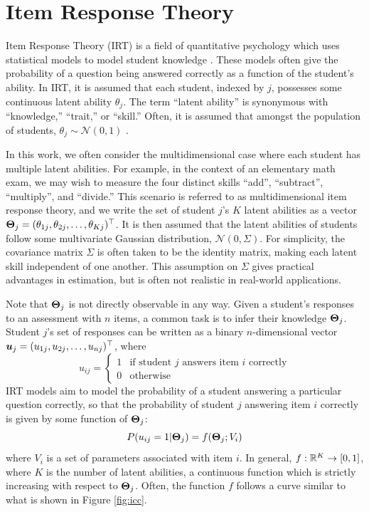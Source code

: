 \section{Item Response Theory}\label{sec:irt}
Item Response Theory (IRT) is a field of quantitative psychology which uses statistical models to model student knowledge \cite{lord1968}. These models often give the probability of a question being answered correctly as a function of the student's ability. In IRT, it is assumed that each student, indexed by $j$, possesses some continuous latent ability $\theta_j$. The term ``latent ability'' is synonymous with ``knowledge,'' ``trait,'' or ``skill.'' Often, it is assumed that amongst the population of students, $\theta_j \sim \mathcal{N}(0,1)$ \cite{thissen}. 

In this work, we often consider the multidimensional case where each student has multiple latent abilities. For example, in the context of an elementary math exam, we may wish to measure the four distinct skills ``add'', ``subtract'', ``multiply'', and ``divide.'' This scenario is referred to as multidimensional item response theory, and we write the set of student $j$'s $K$ latent abilities as a vector $\boldsymbol{\Theta}_j = (\theta_{1j}, \theta_{2j}, \ldots, \theta_{Kj})^\top$. It is then assumed that the latent abilities of students follow some multivariate Gaussian distribution, $\mathcal{N}(0, \Sigma)$. For simplicity, the covariance matrix $\Sigma$ is often taken to be the identity matrix, making each latent skill independent of one another. This assumption on $\Sigma$ gives practical advantages in estimation, but is often not realistic in real-world applications.

Note that $\boldsymbol{\Theta}_j$ is not directly observable in any way. Given a student's responses to an assessment with $n$ items, a common task is to infer their knowledge $\boldsymbol{\Theta}_j$. Student $j$'s set of responses can be written as a binary $n$-dimensional vector $\boldsymbol{u}_j = (u_{1j}, u_{2j}, \ldots, u_{nj})^\top$, where 
\begin{equation}
  u_{ij} = \begin{cases} 1 & \text{if student } j \text{ answers item } i \text{ correctly} \\0 & \text{otherwise} \end{cases} 
  \label{eq:responses}
\end{equation}
IRT models aim to model the probability of a student answering a particular question correctly, so that the probability of student $j$ answering item $i$ correctly is given by some function of $\boldsymbol{\Theta}_j$:
\begin{equation}
  P(u_{ij} = 1 | \boldsymbol{\Theta}_j) = f(\boldsymbol{\Theta}_j; V_i)
  \label{eq:item_response_prob}
\end{equation}
where $V_i$ is a set of parameters associated with item $i$. In general, $f:\mathbb{R}^K \to [0,1]$, where $K$ is the number of latent abilities, a continuous function which is strictly increasing with respect to $\boldsymbol{\Theta}_j$. Often, the function $f$ follows a curve similar to what is shown in Figure \ref{fig:icc}.

